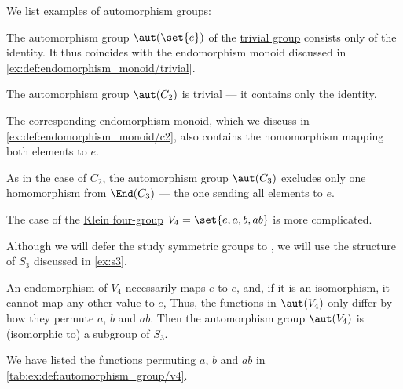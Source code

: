 \begin{example}\label{ex:def:automorphism_group}
  We list examples of \hyperref[def:automorphism_group]{automorphism groups}:
  \begin{thmenum}
     The automorphism group \( \aut(\set{ e }) \) of the \hyperref[def:group/trivial]{trivial group} consists only of the identity. It thus coincides with the endomorphism monoid discussed in \cref{ex:def:endomorphism_monoid/trivial}.

     The automorphism group \( \aut(C_2) \) is trivial --- it contains only the identity.

    The corresponding endomorphism monoid, which we discuss in \cref{ex:def:endomorphism_monoid/c2}, also contains the homomorphism mapping both elements to \( e \).

     As in the case of \( C_2 \), the automorphism group \( \aut(C_3) \) excludes only one homomorphism from \( \End(C_3) \) --- the one sending all elements to \( e \).

     The case of the \hyperref[def:klein_four_group]{Klein four-group} \( V_4 = \set{ e, a, b, ab } \) is more complicated.

    Although we will defer the study symmetric groups to , we will use the structure of \( S_3 \) discussed in \cref{ex:s3}.

    An endomorphism of \( V_4 \) necessarily maps \( e \) to \( e \), and, if it is an isomorphism, it cannot map any other value to \( e \), Thus, the functions in \( \aut(V_4) \) only differ by how they permute \( a \), \( b \) and \( ab \). Then the automorphism group \( \aut(V_4) \) is (isomorphic to) a subgroup of \( S_3 \).

    We have listed the functions permuting \( a \), \( b \) and \( ab \) in \cref{tab:ex:def:automorphism_group/v4}.


\end{thmenum}
\end{example}
